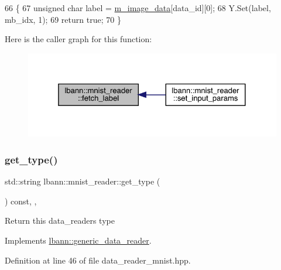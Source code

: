 \begin{DoxyCode}
66                                                                        \{
67   \textcolor{keywordtype}{unsigned} \textcolor{keywordtype}{char} label = \hyperlink{classlbann_1_1mnist__reader_a566ec18b29037abafe472b371f86aaca}{m\_image\_data}[data\_id][0];
68   Y.Set(label, mb\_idx, 1);
69   \textcolor{keywordflow}{return} \textcolor{keyword}{true};
70 \}
\end{DoxyCode}
Here is the caller graph for this function\+:\nopagebreak
\begin{figure}[H]
\begin{center}
\leavevmode
\includegraphics[width=325pt]{classlbann_1_1mnist__reader_a62404e18f0d114b99c11f3800c0d7451_icgraph}
\end{center}
\end{figure}
\mbox{\label{classlbann_1_1mnist__reader_a23c5602f4c0a98ee915f33e434c60d80}} 
\subsubsection{\texorpdfstring{get\+\_\+type()}{get\_type()}}
{\footnotesize\ttfamily std\+::string lbann\+::mnist\+\_\+reader\+::get\+\_\+type (\begin{DoxyParamCaption}{ }\end{DoxyParamCaption}) const\hspace{0.3cm}{\ttfamily [inline]}, {\ttfamily [override]}, {\ttfamily [virtual]}}

Return this data\+\_\+reader\textquotesingle{}s type 

Implements \hyperlink{classlbann_1_1generic__data__reader_abeb849fb8e10b4fa317c90bc33f61758}{lbann\+::generic\+\_\+data\+\_\+reader}.



Definition at line 46 of file data\+\_\+reader\+\_\+mnist.\+hpp.


